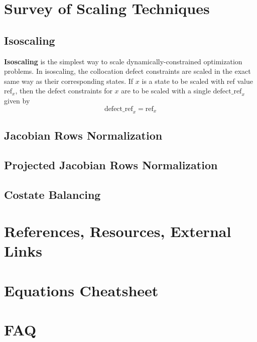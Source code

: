 \documentclass{article}
\begin{document}
\newpage
\section{Survey of Scaling Techniques}

\subsection*{Isoscaling}

\textbf{Isoscaling} is the simplest way to scale dynamically-constrained optimization problems. In isoscaling, the collocation defect constraints are scaled in the exact same way as their corresponding states. If $x$ is a state to be scaled with ref value $\text{ref}_x$, then the defect constraints for $x$ are to be scaled with a single $\text{defect\_ref}_x$ given by
\begin{equation*}
    \text{defect\_ref}_x = \text{ref}_x
\end{equation*}

\subsection*{Jacobian Rows Normalization}

\subsection*{Projected Jacobian Rows Normalization}

\subsection*{Costate Balancing}

\newpage
{}
\section*{References, Resources, External Links}

\newpage
{}
\section*{Equations Cheatsheet}

\newpage
{}
\section*{FAQ}
\end{document}
